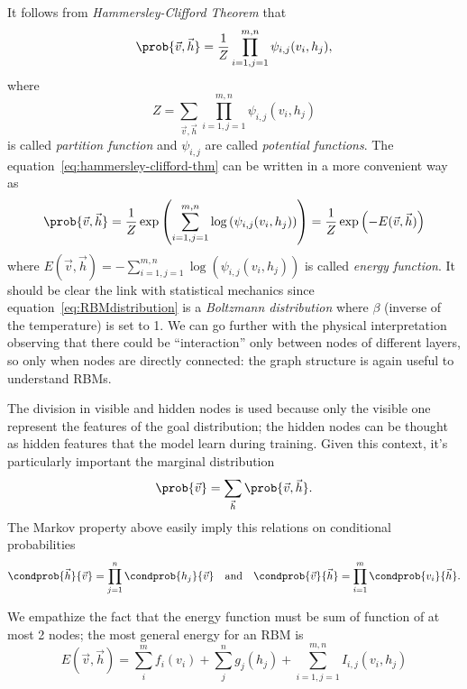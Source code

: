 \documentclass[]{article}
\begin{document}
  
  It follows from \emph{Hammersley-Clifford Theorem}\cite{fischer2012introduction} that 
  \begin{equation} \label{eq:hammersley-clifford-thm}
    \prob{\vec{v}, \vec{h}} = \frac{1}{Z} \prod_{i=1,j=1}^{m,n} \psi_{i,j}(v_i, h_j),
  \end{equation}
  where
  \[Z = \sum_{\vec{v}, \vec{h}}\prod_{i=1,j=1}^{m,n} \psi_{i,j}(v_i, h_j)\]
  is called \emph{partition function} and \(\psi_{i,j}\) are called \emph{potential functions}.
  The equation~\eqref{eq:hammersley-clifford-thm} can be written in a more convenient way as
  \begin{equation} \label{eq:RBMdistribution}
    \prob{\vec{v}, \vec{h}} 
      = \frac{1}{Z} \exp\left(\sum_{i=1,j=1}^{m,n}\log\left(\psi_{i,j}(v_i, h_j)\right)\right)
      = \frac{1}{Z} \exp\left(-E(\vec{v}, \vec{h})\right)
  \end{equation}
  where \(E(\vec{v}, \vec{h})=-\sum_{i=1,j=1}^{m,n}\log\left(\psi_{i,j}(v_i, h_j)\right)\) is called
  \emph{energy function}. It should be clear the link with statistical mechanics since equation~\eqref{eq:RBMdistribution}
  is a \emph{Boltzmann distribution} where \(\beta\) (inverse of the temperature) is set to 1. 
  We can go further with the physical interpretation observing that there could be ``interaction''
  only between nodes of different layers, so only when nodes are directly connected: the graph
  structure is again useful to understand RBMs.
  
  The division in visible and hidden nodes is used because only the visible one represent the
  features of the goal distribution; the hidden nodes can be thought as hidden features that
  the model learn during training. Given this context, it's particularly important the marginal
  distribution
  \[\prob{\vec{v}} = \sum_{\vec{h}} \prob{\vec{v},\vec{h}}.\]
  The Markov property above easily imply this relations on conditional probabilities
  \[
    \condprob{\vec{h}}{\vec{v}} = \prod_{j=1}^n \condprob{h_j}{\vec{v}} \quad\text{and}\quad
    \condprob{\vec{v}}{\vec{h}} = \prod_{i=1}^m \condprob{v_i}{\vec{h}}.
  \]
  
  We empathize the fact that the energy function must be sum of function of at most 2 nodes;
  the most general energy for an RBM is
  \begin{equation} \label{eq:energyRBM}
    E(\vec{v}, \vec{h}) = \sum_{i}^m f_i{(v_i)} + \sum_{j}^n g_j{(h_j)} +
                          \sum_{i=1,j=1}^{m,n} I_{i,j}{(v_i,h_j)}
  \end{equation}
  
\end{document}
